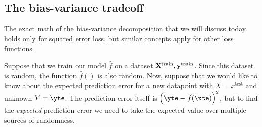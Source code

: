 {\subsection{The bias-variance tradeoff}

 The exact math of the bias-variance decomposition that we will discuss today holds only for squared error loss, but similar concepts apply for other loss functions. 
 
 Suppose that we train our model $\hat{f}$ on a dataset $\bold{X}^\mathrm{train}, \bold{y}^\mathrm{train}$. Since this dataset is random, the function $\hat{f}()$ is also random. Now, suppose that we would like to know about the expected prediction error for a new datapoint with $X=x^\mathrm{test}$ and unknown $Y=\yte$. The prediction error itself is 
$
\left(\yte - \hat{f}(\xte)\right)^2
$, but to find the \emph{expected} prediction error we need to take the expected value over multiple sources of randomness. 

}
